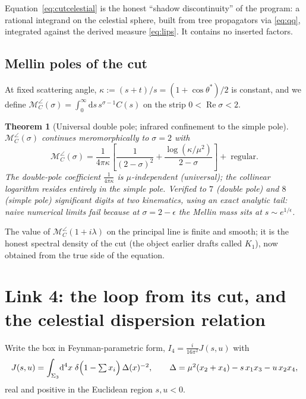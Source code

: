 \documentclass[12pt,a4paper]{article}
\theoremstyle{plain}
\newtheorem{theorem}{Theorem}[section]
\theoremstyle{definition}
\theoremstyle{remark}
\newcommand{\dd}{\mathrm{d}}
\newcommand{\cM}{\mathcal{M}}
\begin{document}
Equation~\eqref{eq:cutcelestial} is the honest ``shadow discontinuity''
of the program: a rational integrand on the celestial sphere, built
from tree propagators via \eqref{eq:qq}, integrated against the derived
measure \eqref{eq:lips}.  It contains no inserted factors.

\subsection{Mellin poles of the cut}

At fixed scattering angle, $\kappa:=(s+t)/s=(1+\cos\theta^*)/2$ is
constant, and we define
$\cM_C^{\angle}(\sigma)=\int_0^\infty\dd s\,s^{\sigma-1}C(s)$ on the
strip $0<\operatorname{Re}\sigma<2$.

\begin{theorem}[Universal double pole; infrared confinement to the
simple pole]
\label{thm:poles}
$\cM_C^{\angle}(\sigma)$ continues meromorphically to
$\sigma=2$ with
\begin{equation}
\cM_C^{\angle}(\sigma)
=\frac{1}{4\pi\kappa}
\left[\frac{1}{(2-\sigma)^2}
+\frac{\log(\kappa/\mu^2)}{2-\sigma}\right]
+\;\text{regular}.
\label{eq:poles}
\end{equation}
The double-pole coefficient $\tfrac{1}{4\pi\kappa}$ is
$\mu$-independent (universal); the collinear logarithm resides entirely
in the simple pole.  Verified to $7$ (double pole) and $8$ (simple
pole) significant digits at two kinematics, using an exact analytic
tail: naive numerical limits fail because at $\sigma=2-\epsilon$ the
Mellin mass sits at $s\sim e^{1/\epsilon}$.
\end{theorem}

The value of $\cM_C^{\angle}(1+i\lambda)$ on the principal line is
finite and smooth; it is the honest spectral density of the cut
(the object earlier drafts called $K_1$), now obtained from the true
side of the equation.

\section{Link 4: the loop from its cut, and the celestial dispersion
relation}
\label{sec:link4}

Write the box in Feynman-parametric form,
$I_4=\tfrac{i}{16\pi^2}J(s,u)$ with
\begin{equation}
J(s,u)=\int_{\Sigma_3}\!\dd^4x\;\delta\Bigl(1-\textstyle\sum x_i\Bigr)\,
\Delta(x)^{-2},\qquad
\Delta=\mu^2(x_2+x_4)-s\,x_1x_3-u\,x_2x_4 ,
\label{eq:parametric}
\end{equation}
real and positive in the Euclidean region $s,u<0$.
\end{document}
